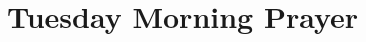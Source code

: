 
\null\medskip{%
\parindent 0pt
\noindent
\ifx\preLilyPondExample \undefined
\else
  \expandafter\preLilyPondExample
\fi
\def\lilypondbook{}%

\ifx\postLilyPondExample \undefined
\else
  \expandafter\postLilyPondExample
\fi
}

\newpage

\section{Tuesday Morning Prayer}

{%
\parindent 0pt
\noindent
\ifx\preLilyPondExample \undefined
\else
  \expandafter\preLilyPondExample
\fi
\def\lilypondbook{}%

\ifx\postLilyPondExample \undefined
\else
  \expandafter\postLilyPondExample
\fi
}


\null\medskip{%
\parindent 0pt
\noindent
\ifx\preLilyPondExample \undefined
\else
  \expandafter\preLilyPondExample
\fi
\def\lilypondbook{}%

\ifx\postLilyPondExample \undefined
\else
  \expandafter\postLilyPondExample
\fi
}

\newpage

{%
\parindent 0pt
\noindent
\ifx\preLilyPondExample \undefined
\else
  \expandafter\preLilyPondExample
\fi
\def\lilypondbook{}%

\ifx\postLilyPondExample \undefined
\else
  \expandafter\postLilyPondExample
\fi
}


\null\medskip{%
\parindent 0pt
\noindent
\ifx\preLilyPondExample \undefined
\else
  \expandafter\preLilyPondExample
\fi
\def\lilypondbook{}%

\ifx\postLilyPondExample \undefined
\else
  \expandafter\postLilyPondExample
\fi
}

\newpage

{%
\parindent 0pt
\noindent
\ifx\preLilyPondExample \undefined
\else
  \expandafter\preLilyPondExample
\fi
\def\lilypondbook{}%

\ifx\postLilyPondExample \undefined
\else
  \expandafter\postLilyPondExample
\fi
}

